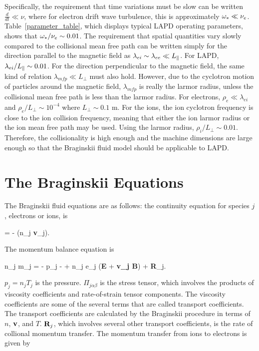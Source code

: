 Specifically, the requirement that time variations must be slow can be written $\frac{d}{dt} \ll \nu$, where for electron drift wave turbulence, this is approximately $\omega_* \ll \nu_{e}$.
Table~\ref{parameter_table}, which displays typical LAPD operating parameters, shows that $\omega_* / \nu_{e} \sim 0.01$. The requirement that spatial quantities vary slowly compared to the collisional
mean free path can be written simply for the direction parallel to the magnetic field as $\lambda_{ei} \sim \lambda_{ee} \ll L_\parallel$. 
For LAPD, $\lambda_{ei} / L_\parallel \sim 0.01$. For the direction perpendicular
to the magnetic field, the same kind of relation $\lambda_{mfp} \ll L_\perp$ must also hold. However, due to the cyclotron motion of particles around the magnetic field, $\lambda_{mfp}$ is really
the larmor radius, unless the collisional mean free path is less than the larmor radius. For electrons, $\rho_e \ll \lambda_{ei}$ and $\rho_e/L_\perp \sim 10^{-4}$ where $L_\perp \sim 0.1$ m. 
For the ions, the ion cyclotron frequency is close to the ion collision frequency, meaning that either the ion larmor radius or the ion mean free path may be used. 
Using the larmor radius, $\rho_i/L_\perp \sim 0.01$. Therefore, the collisionality is high enough and the machine dimensions are large enough so that the Braginskii fluid model should be
applicable to LAPD.

\section{The Braginskii Equations}
\label{s_braginskii_eqns}

The Braginskii fluid equations are as follows: 
the continuity equation for species $j$, electrons or ions, is~\cite{wesson2004,Braginskii1965}

\beq
\label{brag_cont}
 = - \grad \cdot (n_j {\bf v}_j).
\eeq

The momentum balance equation is

\beq
\label{brag_mom}
n_j m_j  = - \grad p_j -  + n_j e_j ({\bf E} + {\bf v_j \times B}) + {\bf R}_j.
\eeq

$p_j = n_j T_j$ is the pressure.
$\Pi_{j \alpha \beta}$ is the stress tensor, which involves the products of viscosity coefficients and rate-of-strain tensor components. 
The viscosity coefficients are some of the several terms that are called transport coefficients. The transport coefficients are calculated by the Braginskii procedure in terms of $n$, ${\bf v}$,
and $T$.
${\bf R}_j$, which involves several other transport coefficients, is the rate of collional momentum transfer.
The momentum transfer from ions to electrons is given by

